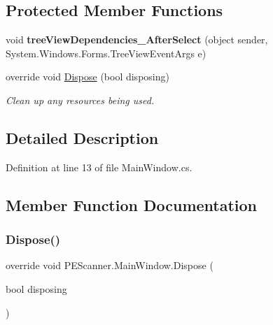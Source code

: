 \subsection*{Protected Member Functions}
\begin{DoxyCompactItemize}
\item 
\mbox{\label{class_p_e_scanner_1_1_main_window_a032cf4c0426b6781bd436bb3dc1c254d}} 
void {\bfseries tree\+View\+Dependencies\+\_\+\+After\+Select} (object sender, System.\+Windows.\+Forms.\+Tree\+View\+Event\+Args e)
\item 
override void \mbox{\hyperlink{class_p_e_scanner_1_1_main_window_a9e2a0de6cb116253b2e7bb35da115ed9}{Dispose}} (bool disposing)
\begin{DoxyCompactList}\small\item\em Clean up any resources being used. \end{DoxyCompactList}\end{DoxyCompactItemize}


\subsection{Detailed Description}


Definition at line 13 of file Main\+Window.\+cs.



\subsection{Member Function Documentation}
\mbox{\label{class_p_e_scanner_1_1_main_window_a9e2a0de6cb116253b2e7bb35da115ed9}} 
\subsubsection{\texorpdfstring{Dispose()}{Dispose()}}
{\footnotesize\ttfamily override void P\+E\+Scanner.\+Main\+Window.\+Dispose (\begin{DoxyParamCaption}\item[{bool}]{disposing }\end{DoxyParamCaption})\hspace{0.3cm}{\ttfamily [protected]}}



